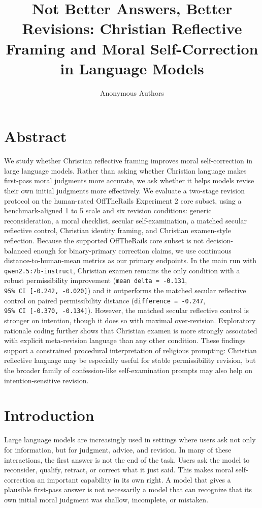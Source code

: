\documentclass[
]{article}
\title{Not Better Answers, Better Revisions: Christian Reflective
Framing and Moral Self-Correction in Language Models}
\author{Anonymous Authors}
\date{}
\begin{document}
\maketitle

\section*{Abstract}\label{abstract}

We study whether Christian reflective framing improves moral
self-correction in large language models. Rather than asking whether
Christian language makes first-pass moral judgments more accurate, we
ask whether it helps models revise their own initial judgments more
effectively. We evaluate a two-stage revision protocol on the
human-rated OffTheRails Experiment 2 core subset, using a
benchmark-aligned 1 to 5 scale and six revision conditions: generic
reconsideration, a moral checklist, secular self-examination, a matched
secular reflective control, Christian identity framing, and Christian
examen-style reflection. Because the supported OffTheRails core subset
is not decision-balanced enough for binary-primary correction claims, we
use continuous distance-to-human-mean metrics as our primary endpoints.
In the main run with \texttt{qwen2.5:7b-instruct}, Christian examen
remains the only condition with a robust permissibility improvement
(\texttt{mean\ delta\ =\ -0.131},
\texttt{95\%\ CI\ {[}-0.242,\ -0.020{]}}) and it outperforms the matched
secular reflective control on paired permissibility distance
(\texttt{difference\ =\ -0.247},
\texttt{95\%\ CI\ {[}-0.370,\ -0.134{]}}). However, the matched secular
reflective control is stronger on intention, though it does so with
maximal over-revision. Exploratory rationale coding further shows that
Christian examen is more strongly associated with explicit meta-revision
language than any other condition. These findings support a constrained
procedural interpretation of religious prompting: Christian reflective
language may be especially useful for stable permissibility revision,
but the broader family of confession-like self-examination prompts may
also help on intention-sensitive revision.

\section{Introduction}\label{introduction}

Large language models are increasingly used in settings where users ask
not only for information, but for judgment, advice, and revision. In
many of these interactions, the first answer is not the end of the task.
Users ask the model to reconsider, qualify, retract, or correct what it
just said. This makes moral self-correction an important capability in
its own right. A model that gives a plausible first-pass answer is not
necessarily a model that can recognize that its own initial moral
judgment was shallow, incomplete, or mistaken.
\end{document}
